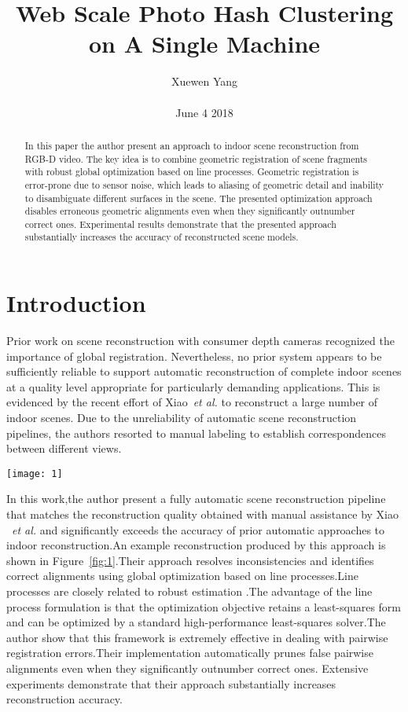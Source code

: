 \documentclass[10pt,twocolumn,letterpaper]{article}
\author{Xuewen Yang\\\\
June 4 2018}
\title{Web Scale Photo Hash Clustering on A Single Machine}
\begin{document}
\maketitle
\begin{abstract}
In this paper the author present an approach to indoor scene reconstruction from RGB-D video. The key idea is to combine geometric registration of scene fragments with robust global optimization based on line processes. Geometric registration is error-prone due to sensor noise, which leads to aliasing of geometric detail and inability to disambiguate different surfaces in the scene. The presented optimization approach disables erroneous geometric alignments even when they significantly outnumber correct ones. Experimental results demonstrate that the presented approach substantially increases the accuracy of reconstructed scene models.
\end{abstract}
\section{Introduction}
Prior work on scene reconstruction with consumer depth cameras recognized the importance of global registration\cite{Henry2014RGB}\cite{Endres20173}. Nevertheless, no prior system appears to be sufficiently reliable to support automatic reconstruction of complete indoor scenes at a quality level appropriate for particularly demanding applications. This is evidenced by the recent effort of Xiao~\emph{et al.} to reconstruct a large number of indoor scenes. Due to the unreliability of automatic scene reconstruction pipelines, the authors resorted to manual labeling to establish correspondences between different views.
\begin{figure*}
\centering
\texttt{[image: 1]}
\caption{A complete apartment reconstructed by the presented approach. The estimated camera trajectory is 151.6 meters long, folded into a diameter of 8.3 meters.}
\label{fig:1}
\end{figure*}
In this work,the author present a fully automatic scene reconstruction pipeline that matches the reconstruction quality obtained with manual assistance by Xiao ~\emph{et al.} and significantly exceeds the accuracy of prior automatic approaches to indoor reconstruction.An example reconstruction produced by this approach is shown in Figure~\ref{fig:1}.Their approach resolves inconsistencies and identifies correct alignments using global optimization based on line processes.Line processes are closely related to robust estimation \cite{Black1996On}.The advantage of the line process formulation is that the optimization objective retains a least-squares form and can be optimized by a standard high-performance least-squares solver.The author show that this framework is extremely effective in dealing with pairwise registration errors.Their implementation automatically prunes false pairwise alignments even when they significantly outnumber correct ones. Extensive experiments demonstrate that their approach substantially increases reconstruction accuracy.
\end{document}
